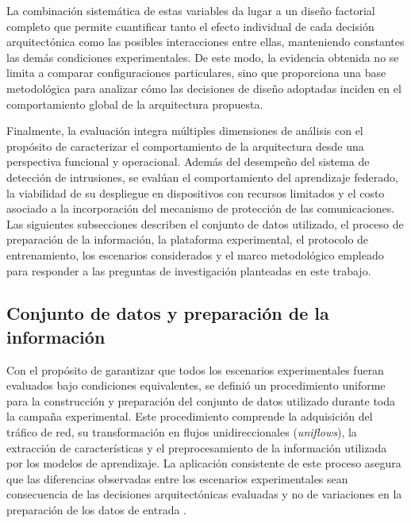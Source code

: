 \documentclass[journal,article,submit,moreauthors]{Definitions/mdpi}
\begin{document}
La combinación sistemática de estas variables da lugar a un diseño factorial completo que permite cuantificar tanto el efecto individual de cada decisión arquitectónica como las posibles interacciones entre ellas, manteniendo constantes las demás condiciones experimentales. De este modo, la evidencia obtenida no se limita a comparar configuraciones particulares, sino que proporciona una base metodológica para analizar cómo las decisiones de diseño adoptadas inciden en el comportamiento global de la arquitectura propuesta.

Finalmente, la evaluación integra múltiples dimensiones de análisis con el propósito de caracterizar el comportamiento de la arquitectura desde una perspectiva funcional y operacional. Además del desempeño del sistema de detección de intrusiones, se evalúan el comportamiento del aprendizaje federado, la viabilidad de su despliegue en dispositivos con recursos limitados y el costo asociado a la incorporación del mecanismo de protección de las comunicaciones. Las siguientes subsecciones describen el conjunto de datos utilizado, el proceso de preparación de la información, la plataforma experimental, el protocolo de entrenamiento, los escenarios considerados y el marco metodológico empleado para responder a las preguntas de investigación planteadas en este trabajo.

\subsection{Conjunto de datos y preparación de la información}
Con el propósito de garantizar que todos los escenarios experimentales fueran evaluados bajo condiciones equivalentes, se definió un procedimiento uniforme para la construcción y preparación del conjunto de datos utilizado durante toda la campaña experimental. Este procedimiento comprende la adquisición del tráfico de red, su transformación en flujos unidireccionales (\textit{uniflows}), la extracción de características y el preprocesamiento de la información utilizada por los modelos de aprendizaje. La aplicación consistente de este proceso asegura que las diferencias observadas entre los escenarios experimentales sean consecuencia de las decisiones arquitectónicas evaluadas y no de variaciones en la preparación de los datos de entrada \cite{Hajj2023,Ficco2024}.
\end{document}
